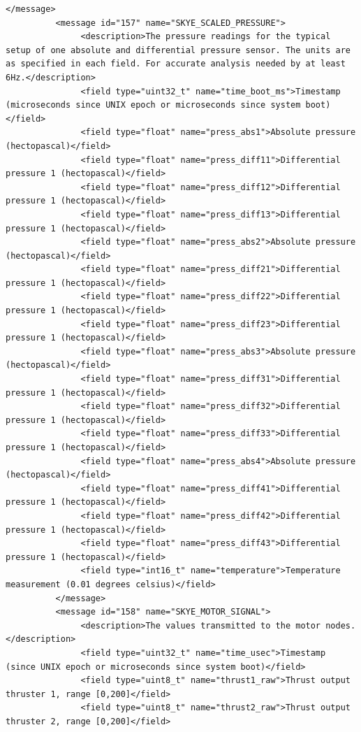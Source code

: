 \begin{lstlisting}[captionpos=b, caption="Definition of \textsc{Skye} specific Mavlink messages", label=app_xml]
          </message>
          <message id="157" name="SKYE_SCALED_PRESSURE">
               <description>The pressure readings for the typical setup of one absolute and differential pressure sensor. The units are as specified in each field. For accurate analysis needed by at least 6Hz.</description>
               <field type="uint32_t" name="time_boot_ms">Timestamp (microseconds since UNIX epoch or microseconds since system boot)</field>
               <field type="float" name="press_abs1">Absolute pressure (hectopascal)</field>
               <field type="float" name="press_diff11">Differential pressure 1 (hectopascal)</field>
               <field type="float" name="press_diff12">Differential pressure 1 (hectopascal)</field>
               <field type="float" name="press_diff13">Differential pressure 1 (hectopascal)</field>
               <field type="float" name="press_abs2">Absolute pressure (hectopascal)</field>
               <field type="float" name="press_diff21">Differential pressure 1 (hectopascal)</field>
               <field type="float" name="press_diff22">Differential pressure 1 (hectopascal)</field>
               <field type="float" name="press_diff23">Differential pressure 1 (hectopascal)</field>
               <field type="float" name="press_abs3">Absolute pressure (hectopascal)</field>
               <field type="float" name="press_diff31">Differential pressure 1 (hectopascal)</field>
               <field type="float" name="press_diff32">Differential pressure 1 (hectopascal)</field>
               <field type="float" name="press_diff33">Differential pressure 1 (hectopascal)</field>
               <field type="float" name="press_abs4">Absolute pressure (hectopascal)</field>
               <field type="float" name="press_diff41">Differential pressure 1 (hectopascal)</field>
               <field type="float" name="press_diff42">Differential pressure 1 (hectopascal)</field>
               <field type="float" name="press_diff43">Differential pressure 1 (hectopascal)</field>
               <field type="int16_t" name="temperature">Temperature measurement (0.01 degrees celsius)</field>
          </message>
          <message id="158" name="SKYE_MOTOR_SIGNAL">
               <description>The values transmitted to the motor nodes.</description>
               <field type="uint32_t" name="time_usec">Timestamp (since UNIX epoch or microseconds since system boot)</field>
               <field type="uint8_t" name="thrust1_raw">Thrust output thruster 1, range [0,200]</field>
               <field type="uint8_t" name="thrust2_raw">Thrust output thruster 2, range [0,200]</field>

\end{lstlisting}
